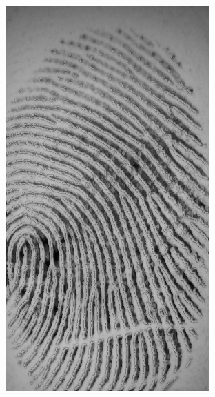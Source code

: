 \documentclass{beamer}
\begin{document}
{\begin{figure}[!ht]
\begin{subfigure}[ht]{0.15\textwidth}
            \includegraphics[width=\textwidth]{fingerprints/2002Db2a/1_1_background.jpg}
        \end{subfigure}
        \qquad
        \begin{subfigure}[ht]{0.15\textwidth}

\end{subfigure}
\end{figure}}
\end{document}
